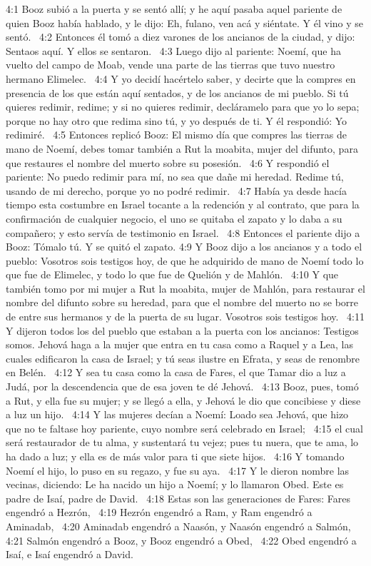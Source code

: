 4:1 Booz subió a la puerta y se sentó allí; y he aquí pasaba aquel pariente de quien Booz había hablado, y le dijo: Eh, fulano, ven acá y siéntate. Y él vino y se sentó.  
4:2 Entonces él tomó a diez varones de los ancianos de la ciudad, y dijo: Sentaos aquí. Y ellos se sentaron.  
4:3 Luego dijo al pariente: Noemí, que ha vuelto del campo de Moab, vende una parte de las tierras que tuvo nuestro hermano Elimelec.  
4:4 Y yo decidí hacértelo saber, y decirte que la compres en presencia de los que están aquí sentados, y de los ancianos de mi pueblo. Si tú quieres redimir, redime; y si no quieres redimir, decláramelo para que yo lo sepa; porque no hay otro que redima sino tú, y yo después de ti. Y él respondió: Yo redimiré.  
4:5 Entonces replicó Booz: El mismo día que compres las tierras de mano de Noemí, debes tomar también a Rut la moabita, mujer del difunto, para que restaures el nombre del muerto sobre su posesión.  
4:6 Y respondió el pariente: No puedo redimir para mí, no sea que dañe mi heredad. Redime tú, usando de mi derecho, porque yo no podré redimir.  
4:7 Había ya desde hacía tiempo esta costumbre en Israel tocante a la redención y al contrato, que para la confirmación de cualquier negocio, el uno se quitaba el zapato y lo daba a su compañero; y esto servía de testimonio en Israel.  
4:8 Entonces el pariente dijo a Booz: Tómalo tú. Y se quitó el zapato. 
4:9 Y Booz dijo a los ancianos y a todo el pueblo: Vosotros sois testigos hoy, de que he adquirido de mano de Noemí todo lo que fue de Elimelec, y todo lo que fue de Quelión y de Mahlón.  
4:10 Y que también tomo por mi mujer a Rut la moabita, mujer de Mahlón, para restaurar el nombre del difunto sobre su heredad, para que el nombre del muerto no se borre de entre sus hermanos y de la puerta de su lugar. Vosotros sois testigos hoy.  
4:11 Y dijeron todos los del pueblo que estaban a la puerta con los ancianos: Testigos somos. Jehová haga a la mujer que entra en tu casa como a Raquel y a Lea, las cuales edificaron la casa de Israel; y tú seas ilustre en Efrata, y seas de renombre en Belén.  
4:12 Y sea tu casa como la casa de Fares, el que Tamar dio a luz a Judá, por la descendencia que de esa joven te dé Jehová.  
4:13 Booz, pues, tomó a Rut, y ella fue su mujer; y se llegó a ella, y Jehová le dio que concibiese y diese a luz un hijo.  
4:14 Y las mujeres decían a Noemí: Loado sea Jehová, que hizo que no te faltase hoy pariente, cuyo nombre será celebrado en Israel;  
4:15 el cual será restaurador de tu alma, y sustentará tu vejez; pues tu nuera, que te ama, lo ha dado a luz; y ella es de más valor para ti que siete hijos.  
4:16 Y tomando Noemí el hijo, lo puso en su regazo, y fue su aya.  
4:17 Y le dieron nombre las vecinas, diciendo: Le ha nacido un hijo a Noemí; y lo llamaron Obed. Este es padre de Isaí, padre de David.  
4:18 Estas son las generaciones de Fares: Fares engendró a Hezrón,  
4:19 Hezrón engendró a Ram, y Ram engendró a Aminadab,  
4:20 Aminadab engendró a Naasón, y Naasón engendró a Salmón,  
4:21 Salmón engendró a Booz, y Booz engendró a Obed,  
4:22 Obed engendró a Isaí, e Isaí engendró a David.
